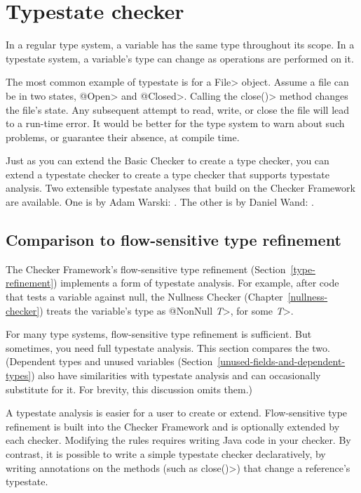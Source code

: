\htmlhr
\chapter{Typestate checker\label{typestate-checker}}

In a regular type system, a variable has the same type throughout its
scope.
In a typestate system, a variable's type can change as operations
are performed on it.

The most common example of typestate is for a \<File> object.  Assume a file
can be in two states, \<@Open> and \<@Closed>.  Calling the \<close()> method
changes the file's state.  Any subsequent attempt to read, write, or close
the file will lead to a run-time error.  It would be better for the type
system to warn about such problems, or guarantee their absence, at compile
time.

Just as you can extend the Basic Checker to create a type checker, you can
extend a typestate checker to create a type checker that supports typestate
analysis.  Two extensible typestate analyses that build on the Checker
Framework are available.  One is by Adam Warski:
.
The other is by Daniel Wand:
.


\section{Comparison to flow-sensitive type refinement\label{typestate-vs-type-refinement}}

The Checker Framework's flow-sensitive type refinement
(Section~\ref{type-refinement}) implements a form of typestate analysis.
For example, after code that tests a variable against null, the Nullness
Checker (Chapter~\ref{nullness-checker}) treats the variable's type as
\<@NonNull \emph{T}>, for some \<\emph{T}>\@.

For many type systems, flow-sensitive type refinement is sufficient.  But
sometimes, you need full typestate analysis.  This section compares the
two.  (Dependent types and unused variables
(Section~\ref{unused-fields-and-dependent-types}) also have similarities
with typestate analysis and can occasionally substitute for it.  For
brevity, this discussion omits them.)

A typestate analysis is easier for a user to create or extend.
Flow-sensitive type refinement is built into the Checker Framework and is
optionally extended by each checker.  Modifying the rules requires writing
Java code in your checker.  By contrast, it is possible to write a simple
typestate checker declaratively, by writing annotations on the methods
(such as \<close()>) that change a reference's typestate.

